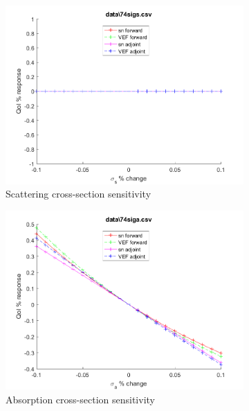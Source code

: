 \documentclass{article}
\begin{document}
\begin{figure}[H]
\begin{subfigure}{.5\textwidth}
  \includegraphics[width=.98\linewidth]{IanProposal/figures2/74sigsSens.png}
  \caption{Scattering cross-section sensitivity}
  \label{fig:sfig2}
\end{subfigure}%
\begin{subfigure}{.5\textwidth}
  \centering
  \includegraphics[width=.98\linewidth]{IanProposal/figures2/74sigaSens.png}
  \caption{Absorption cross-section sensitivity}
  \label{fig:sfig5}
\end{subfigure}%
\caption{}
\label{fig:fig}
\end{figure}
\newpage

\end{document}
